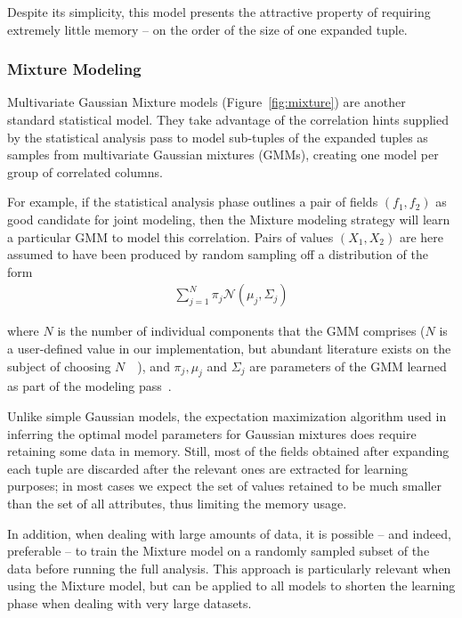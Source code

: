 Despite its simplicity, this model presents the attractive property of requiring extremely little memory -- on the order of the size of one expanded tuple.


\subsubsection{Mixture Modeling}
\label{sec:mixture_model}
Multivariate Gaussian Mixture models (Figure~\ref{fig:mixture}) are another standard statistical model.  They take advantage of the correlation hints supplied by the statistical analysis pass to model sub-tuples of the expanded tuples as samples from multivariate Gaussian mixtures (GMMs), creating one model per group of correlated columns.

For example, if the statistical analysis phase outlines a pair of fields $(f_1, f_2)$ as good candidate for joint modeling, then the Mixture modeling strategy will learn a particular GMM to model this correlation. Pairs of values $(X_1, X_2)$ are here assumed to have been produced by random sampling off a distribution of the form
\begin{align*}
\sum_{j=1}^{N} \pi_j \mathcal N(\mu_j, \Sigma_j)
\end{align*}

where $N$ is the number of individual components that the GMM comprises ($N$ is a user-defined value in our implementation, but abundant literature exists on the subject of choosing $N$~\cite{Schwartz1978}~\cite{Akaike1974}), and $\pi_j, \mu_j$ and $\Sigma_j$ are parameters of the GMM learned as part of the modeling pass~\cite{Dempster1977}.

Unlike simple Gaussian models, the expectation maximization algorithm used in inferring the optimal model parameters for Gaussian mixtures does require retaining some data in memory. Still, most of the fields obtained after expanding each tuple are discarded after the relevant ones are extracted for learning purposes; in most cases we expect the set of values retained to be much smaller than the set of all attributes, thus limiting the memory usage. 

In addition, when dealing with large amounts of data, it is possible -- and indeed, preferable -- to train the Mixture model on a randomly sampled subset of the data before running the full analysis. This approach is particularly relevant when using the Mixture model, but can be applied to all models to shorten the learning phase when dealing with very large datasets.


